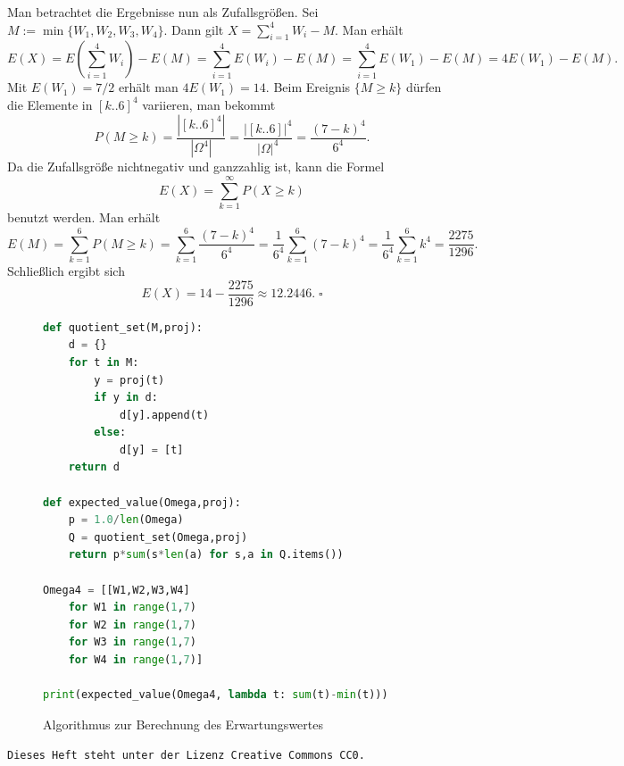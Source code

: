 \documentclass[a4paper,10pt,fleqn,twoside]{scrartcl}
\numberwithin{equation}{section}
\renewcommand{\qedsymbol}{\ensuremath{\square}}
\theoremstyle{Aufgabe}
\begin{document}
Man betrachtet die Ergebnisse nun als Zufallsgrößen. Sei
$M:=\min\{W_1,W_2,W_3,W_4\}$. Dann gilt $X=\sum_{i=1}^4 W_i-M$.
Man erhält
\[E(X) = E(\sum_{i=1}^4 W_i)-E(M) = \sum_{i=1}^4 E(W_i)-E(M)
= \sum_{i=1}^4 E(W_1)-E(M) = 4E(W_1)-E(M).\]
Mit $E(W_1)=7/2$ erhält man $4E(W_1)=14$. Beim Ereignis
$\{M\ge k\}$ dürfen die Elemente in
$[k..6]^4$ variieren, man bekommt%
\[P(M\ge k) = \frac{|[k..6]^4|}{|\Omega^4|}
= \frac{|[k..6]|^4}{|\Omega|^4} = \frac{(7-k)^4}{6^4}.\]
Da die Zufallsgröße nichtnegativ und ganzzahlig ist, kann die Formel%
\[E(X) = \sum_{k=1}^\infty P(X\ge k)\]
benutzt werden. Man erhält
\[E(M) = \sum_{k=1}^6 P(M\ge k) = \sum_{k=1}^6 \frac{(7-k)^4}{6^4}
= \frac{1}{6^4}\sum_{k=1}^6 (7-k)^4 = \frac{1}{6^4}\sum_{k=1}^6 k^4
= \frac{2275}{1296}.\]
Schließlich ergibt sich
\[E(X) = 14-\frac{2275}{1296} \approx 12.2446.\;\qedsymbol\]

\begin{figure}[t]
\begin{lstlisting}[language=Python]
def quotient_set(M,proj):
    d = {}
    for t in M:
        y = proj(t)
        if y in d:
            d[y].append(t)
        else:
            d[y] = [t]
    return d

def expected_value(Omega,proj):
    p = 1.0/len(Omega)
    Q = quotient_set(Omega,proj)
    return p*sum(s*len(a) for s,a in Q.items())

Omega4 = [[W1,W2,W3,W4]
    for W1 in range(1,7)
    for W2 in range(1,7)
    for W3 in range(1,7)
    for W4 in range(1,7)]
    
print(expected_value(Omega4, lambda t: sum(t)-min(t)))
\end{lstlisting}
\caption{Algorithmus zur Berechnung des Erwartungswertes}
\label{fig:Algorithmus-Erwartungswert}
\end{figure}

\vfill\noindent
\texttt{Dieses Heft steht unter der Lizenz Creative Commons CC0.}
\end{document}
